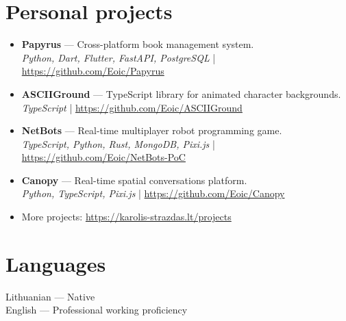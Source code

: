 \documentclass[10pt,a4paper]{article}
\newcommand{\techstack}[1]{\textcolor{black!70}{\small\textit{#1}}}
\begin{document}
\section*{Personal projects}
\begin{itemize}[leftmargin=*,itemsep=0.08em,topsep=0.08em]
	\item \textbf{Papyrus} --- Cross-platform book management system.\\
	      \techstack{Python, Dart, Flutter, FastAPI, PostgreSQL} | \url{https://github.com/Eoic/Papyrus}
	\item \textbf{ASCIIGround} --- TypeScript library for animated character backgrounds.\\
	      \techstack{TypeScript} | \url{https://github.com/Eoic/ASCIIGround}
	\item \textbf{NetBots} --- Real-time multiplayer robot programming game.\\
	      \techstack{TypeScript, Python, Rust, MongoDB, Pixi.js} | \url{https://github.com/Eoic/NetBots-PoC}
	\item \textbf{Canopy} --- Real-time spatial conversations platform.\\
	      \techstack{Python, TypeScript, Pixi.js} | \url{https://github.com/Eoic/Canopy}
	\item More projects: \url{https://karolis-strazdas.lt/projects}
\end{itemize}

\section*{Languages}
Lithuanian --- Native \\[0.35em]
English --- Professional working proficiency

\endgroup
\end{document}
